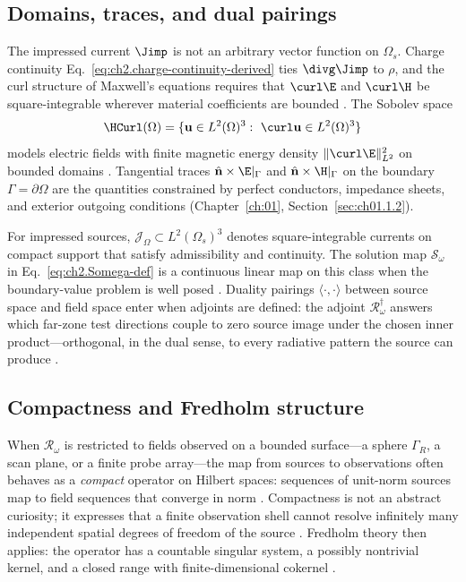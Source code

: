 
\subsection{Domains, traces, and dual pairings}
\label{sec:ch02.3.1}

The impressed current $\Jimp$ is not an arbitrary vector function on $\Omega_s$. Charge continuity Eq.~\eqref{eq:ch2.charge-continuity-derived} ties $\divg\Jimp$ to $\rho$, and the curl structure of Maxwell's equations requires that $\curl\E$ and $\curl\H$ be square-integrable wherever material coefficients are bounded \cite{stratton1941}. The Sobolev space
\begin{equation}
\label{eq:ch2.Hcurl-def}
\HCurl(\Omega)=\{\mathbf{u}\in L^2(\Omega)^3:\ \curl\mathbf{u}\in L^2(\Omega)^3\}
\end{equation}
models electric fields with finite magnetic energy density $\|\curl\E\|_{L^2}^2$ on bounded domains \cite{stratton1941}. Tangential traces $\hat{\mathbf{n}}\times\E|_\Gamma$ and $\hat{\mathbf{n}}\times\H|_\Gamma$ on the boundary $\Gamma=\partial\Omega$ are the quantities constrained by perfect conductors, impedance sheets, and exterior outgoing conditions (Chapter~\ref{ch:01}, Section~\ref{sec:ch01.1.2}).

For impressed sources, $\mathcal{J}_\Omega\subset L^2(\Omega_s)^3$ denotes square-integrable currents on compact support that satisfy admissibility and continuity. The solution map $\mathcal{S}_\omega$ in Eq.~\eqref{eq:ch2.Somega-def} is a continuous linear map on this class when the boundary-value problem is well posed \cite{stratton1941}. Duality pairings $\langle\cdot,\cdot\rangle$ between source space and field space enter when adjoints are defined: the adjoint $\mathcal{R}_\omega^{\dagger}$ answers which far-zone test directions couple to zero source image under the chosen inner product---orthogonal, in the dual sense, to every radiative pattern the source can produce \cite{harrington2001}.

\subsection{Compactness and Fredholm structure}
\label{sec:ch02.3.2}

When $\mathcal{R}_\omega$ is restricted to fields observed on a bounded surface---a sphere $\Gamma_R$, a scan plane, or a finite probe array---the map from sources to observations often behaves as a \emph{compact} operator on Hilbert spaces: sequences of unit-norm sources map to field sequences that converge in norm \cite{stratton1941}. Compactness is not an abstract curiosity; it expresses that a finite observation shell cannot resolve infinitely many independent spatial degrees of freedom of the source \cite{chu1948,harrington2001}. Fredholm theory then applies: the operator has a countable singular system, a possibly nontrivial kernel, and a closed range with finite-dimensional cokernel \cite{stratton1941}.

